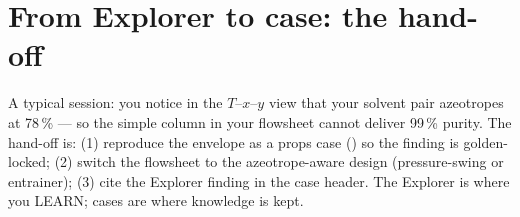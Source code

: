 \documentclass[11pt,a4paper]{article}
\begin{document}
\section{From Explorer to case: the hand-off}

A typical session: you notice in the $T$--$x$--$y$ view that your solvent
pair azeotropes at 78\,\% --- so the simple column in your flowsheet cannot
deliver 99\,\% purity.  The hand-off is: (1) reproduce the envelope as a
props case () so the finding is golden-locked;
(2) switch the flowsheet to the azeotrope-aware design (pressure-swing or
entrainer); (3) cite the Explorer finding in the case header.  The Explorer
is where you LEARN; cases are where knowledge is kept.
\end{document}
